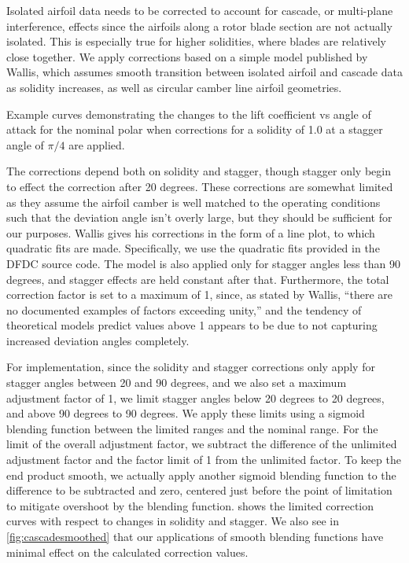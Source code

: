 Isolated airfoil data needs to be corrected to account for cascade, or multi-plane interference, effects since the airfoils along a rotor blade section are not actually isolated.
%
This is especially true for higher solidities, where blades are relatively close together.
%
We apply corrections based on a simple model published by Wallis, which assumes smooth transition between isolated airfoil and cascade data as solidity increases, as well as circular camber line airfoil geometries.
%
\begin{marginfigure}
	
    \caption{Example curves demonstrating the changes to the lift coefficient vs angle of attack for the nominal polar when corrections for a solidity of 1.0 at a stagger angle of \(\pi/4\) are applied.}
	\label{fig:soliditystagger-correction}
\end{marginfigure}
%
The corrections depend both on solidity and stagger, though stagger only begin to effect the correction after 20 degrees.
%
These corrections are somewhat limited as they assume the airfoil camber is well matched to the operating conditions such that the deviation angle isn't overly large, but they should be sufficient for our purposes.
%
Wallis gives his corrections in the form of a line plot, to which quadratic fits are made.
%
Specifically, we use the quadratic fits provided in the DFDC source code.
%
The model is also applied only for stagger angles less than 90 degrees, and stagger effects are held constant after that.
%
Furthermore, the total correction factor is set to a maximum of 1, since, as stated by Wallis, ``there are no documented examples of factors exceeding unity,'' and the tendency of theoretical models predict values above 1 appears to be due to not capturing increased deviation angles completely.

For implementation, since the solidity and stagger corrections only apply for stagger angles between 20 and 90 degrees, and we also set a maximum adjustment factor of 1, we limit stagger angles below 20 degrees to 20 degrees, and above 90 degrees to 90 degrees.
%
We apply these limits using a sigmoid blending function between the limited ranges and the nominal range.
%
For the limit of the overall adjustment factor, we subtract the difference of the unlimited adjustment factor and the factor limit of 1 from the unlimited factor.
%
To keep the end product smooth, we actually apply another sigmoid blending function to the difference to be subtracted and zero, centered just before the point of limitation to mitigate overshoot by the blending function.
%
 shows the limited correction curves with respect to changes in solidity and stagger.
%
We also see in \cref{fig:cascadesmoothed} that our applications of smooth blending functions have minimal effect on the calculated correction values.

